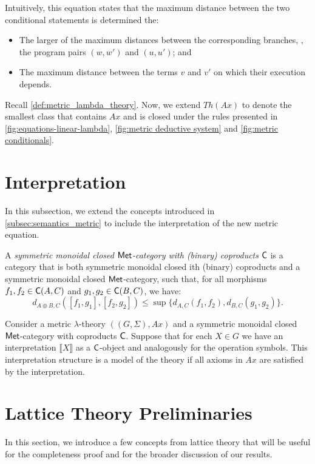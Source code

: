 Intuitively, this equation states that the maximum distance between the two conditional statements is determined the:

\begin{itemize}
    \item The larger of the maximum distances between the corresponding branches, \ie, the program pairs $(w, w')$ and $(u, u')$; and
    \item The maximum distance between the terms $v$ and $v'$ on which their execution depends.
\end{itemize}


Recall \autoref{def:metric_lambda_theory}. Now, we extend \( Th(Ax) \) to denote the smallest class that contains \( Ax \) and is closed under the rules presented in \autoref{fig:equations-linear-lambda}, \autoref{fig:metric deductive system} and \autoref{fig:metric conditionals}.


\section{Interpretation}

In this subsection, we extend the concepts introduced in \autoref{subsec:semantics_metric} to include the interpretation of the new metric equation.

\begin{definition}
  A \emph{symmetric monoidal closed $\mathsf{Met}$-category with (binary) coproducts} $\mathsf{C}$ is a category that is both symmetric monoidal closed ith (binary) coproducts  and a symmetric monoidal closed $\mathsf{Met}$‑category, such that, for all morphisms $f_1, f_2 \in \mathsf{C}(A, C)$ and $g_1, g_2 \in \mathsf{C}(B, C)$, we have:
\[
  d_{A \oplus B, C}([f_1, g_1], [f_2, g_2]) \leq \sup \{d_{A,C}(f_1, f_2), d_{B,C}(g_1, g_2)\}.
\]
\end{definition}


\begin{definition}
  Consider a metric $\lambda$-theory $((G,\Sigma),Ax)$ and a symmetric monoidal closed $\mathsf{Met}$-category with coproducts $\mathsf{C}$. Suppose that for each $X \in G$ we have an interpretation $\llbracket X \rrbracket$ as a $\mathsf{C}$-object and analogously for the operation symbols. This interpretation structure is a model of the theory if all axioms in $Ax$ are satisfied by the interpretation.
\end{definition}



\section{Lattice Theory Preliminaries}
In this section, we introduce a few concepts from lattice theory that will be useful for the completeness proof and for the broader discussion of our results.


